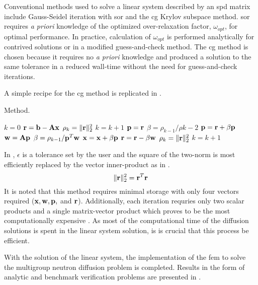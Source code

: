     Conventional methods used to solve a linear system described by an \gls{spd}
    matrix include Gauss-Seidel iteration with \gls{sor} and the \gls{cg} Krylov 
    subspace method. \gls{sor} requires \textit{a priori} knowledge of the 
    optimized over-relaxation factor, $\omega_{opt}$, for optimal performance. 
    In practice, calculation of $\omega_{opt}$ is performed analytically for 
    contrived solutions or in a modified guess-and-check method. The \gls{cg} 
    method is chosen because it requires no \textit{a priori} knowledge and
    produced a solution to the same tolerance in a reduced wall-time without the
    need for guess-and-check iterations.
    
    A simple recipe for the \gls{cg} method is replicated in
     \cite{Kelley1995IterativeEquations}.
    
    \begin{algorithm}
      \caption{ Method.}
      \label{algorithm:CG}
      \begin{algorithmic}[1]
        \State $k = 0$
        \State $\mathbf{r} = \mathbf{b} - \mathbf{A} \mathbf{x}$
        \State $\rho_k = \|\mathbf{r}\|_2^2$
        \State $k = k + 1$
            \State $\mathbf{p} = \mathbf{r}$
          \Else
            \State $\beta = \rho_{k-1} / \rho{k-2}$
            \State $\mathbf{p} = \mathbf{r} + \beta \mathbf{p}$
          \EndIf
          \State $\mathbf{w} = \mathbf{A} \mathbf{p}$
          \State $\beta = \rho_{k-1} / \mathbf{p}^{T} \mathbf{w}$
          \State $\mathbf{x} = \mathbf{x} + \beta \mathbf{p}$
          \State $\mathbf{r} = \mathbf{r} - \beta \mathbf{w}$
          \State $\rho_k = \| \mathbf{r} \|_2^2$
          \State $k=k+1$
        \EndWhile
      \end{algorithmic}
    \end{algorithm}
    
    In , $\epsilon$ is a tolerance set by the user 
    and the square of the two-norm is most efficiently replaced by the vector
    inner-product as in . 
    \begin{equation}
      \label{eq:two_norm_inner}
      \|\mathbf{r}\|_2^2 = \mathbf{r}^{T} \mathbf{r}
    \end{equation}
    It is noted that this method requires minimal storage with only four vectors 
    required ($\mathbf{x}, \mathbf{w}, \mathbf{p},$ and $\mathbf{r}$). Additionally, each iteration requries
    only two scalar products and a single matrix-vector product which proves to
    be the most computationally expensive \cite{Kelley1995IterativeEquations}.
    As most of the computational time of the diffusion solutions is spent in the
    linear system solution, is is crucial that this process be efficient.

    With the solution of the linear system, the implementation of the \gls{fem}
    to solve the multigroup neutron diffusion problem is completed. Results in 
    the form of analytic and benchmark verification problems are presented in
    .
